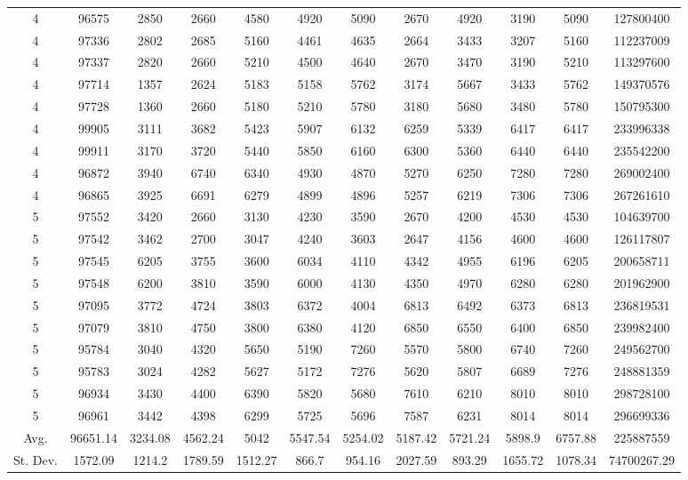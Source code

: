 \documentclass[journal]{IEEEtran}
\begin{document}
\begin{table}
\begin{tabular}{|cc|cccccccc|cc|}
4	&	96575	&	2850	&	2660	&	4580	&	4920	&	5090	&	2670	&	4920	&	3190	&	5090	&	127800400	\\
4	&	97336	&	2802	&	2685	&	5160	&	4461	&	4635	&	2664	&	3433	&	3207	&	5160	&	112237009	\\
4	&	97337	&	2820	&	2660	&	5210	&	4500	&	4640	&	2670	&	3470	&	3190	&	5210	&	113297600	\\
4	&	97714	&	1357	&	2624	&	5183	&	5158	&	5762	&	3174	&	5667	&	3433	&	5762	&	149370576	\\
4	&	97728	&	1360	&	2660	&	5180	&	5210	&	5780	&	3180	&	5680	&	3480	&	5780	&	150795300	\\
4	&	99905	&	3111	&	3682	&	5423	&	5907	&	6132	&	6259	&	5339	&	6417	&	6417	&	233996338	\\
4	&	99911	&	3170	&	3720	&	5440	&	5850	&	6160	&	6300	&	5360	&	6440	&	6440	&	235542200	\\
4	&	96872	&	3940	&	6740	&	6340	&	4930	&	4870	&	5270	&	6250	&	7280	&	7280	&	269002400	\\
4	&	96865	&	3925	&	6691	&	6279	&	4899	&	4896	&	5257	&	6219	&	7306	&	7306	&	267261610	\\
\hline																							
5	&	97552	&	3420	&	2660	&	3130	&	4230	&	3590	&	2670	&	4200	&	4530	&	4530	&	104639700	\\
5	&	97542	&	3462	&	2700	&	3047	&	4240	&	3603	&	2647	&	4156	&	4600	&	4600	&	126117807	\\
5	&	97545	&	6205	&	3755	&	3600	&	6034	&	4110	&	4342	&	4955	&	6196	&	6205	&	200658711	\\
5	&	97548	&	6200	&	3810	&	3590	&	6000	&	4130	&	4350	&	4970	&	6280	&	6280	&	201962900	\\
5	&	97095	&	3772	&	4724	&	3803	&	6372	&	4004	&	6813	&	6492	&	6373	&	6813	&	236819531	\\
5	&	97079	&	3810	&	4750	&	3800	&	6380	&	4120	&	6850	&	6550	&	6400	&	6850	&	239982400	\\
5	&	95784	&	3040	&	4320	&	5650	&	5190	&	7260	&	5570	&	5800	&	6740	&	7260	&	249562700	\\
5	&	95783	&	3024	&	4282	&	5627	&	5172	&	7276	&	5620	&	5807	&	6689	&	7276	&	248881359	\\
5	&	96934	&	3430	&	4400	&	6390	&	5820	&	5680	&	7610	&	6210	&	8010	&	8010	&	298728100	\\
5	&	96961	&	3442	&	4398	&	6299	&	5725	&	5696	&	7587	&	6231	&	8014	&	8014	&	296699336	\\
\hline																							
Avg.	&	96651.14	&	3234.08	&	4562.24	&	5042	&	5547.54	&	5254.02	&	5187.42	&	5721.24	&	5898.9	&	6757.88	&	225887559	\\
St. Dev.	&	1572.09	&	1214.2	&	1789.59	&	1512.27	&	866.7	&	954.16	&	2027.59	&	893.29	&	1655.72	&	1078.34	&	74700267.29	\\
\hline																							

\end{tabular}
\end{table}
\end{document}
